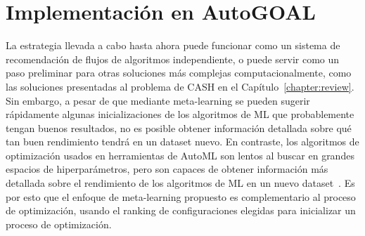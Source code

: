 
\section{Implementación en AutoGOAL}\label{sec:autogoal_imp}


La estrategia llevada a cabo hasta ahora puede funcionar como un sistema de recomendación de flujos de algoritmos independiente, o puede servir como un paso preliminar para otras soluciones más complejas computacionalmente, como las soluciones presentadas al problema de CASH en el Capítulo~\ref{chapter:review}. Sin embargo, a pesar de que mediante meta-learning se pueden sugerir rápidamente algunas inicializaciones de los algoritmos de ML que probablemente tengan buenos resultados, no es posible obtener información detallada sobre qué tan buen rendimiento tendrá en un dataset nuevo. En contraste, los algoritmos de optimización usados en herramientas de AutoML son lentos al buscar en grandes espacios de hiperparámetros, pero son capaces de obtener información más detallada sobre el rendimiento de los algoritmos de ML en un nuevo dataset~\cite{fuerer2015efficient}. Es por esto que el enfoque de meta-learning propuesto es complementario al proceso de optimización, usando el ranking de configuraciones elegidas para inicializar un proceso de optimización.


